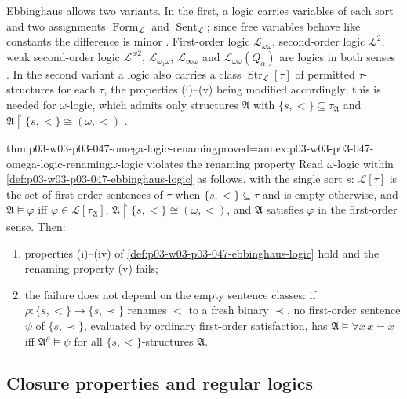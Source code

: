 Ebbinghaus allows two variants.  In the first, a logic carries variables of
each sort and two assignments \(\operatorname{Form}_{\mathscr L}\) and
\(\operatorname{Sent}_{\mathscr L}\); since free variables behave like
constants the difference is minor \cite[Ch.~II, \S1.1.2, pp.~28--29]{Ebbinghaus1985ExtendedLogics}.
First-order logic \(\mathscr L_{\omega\omega}\), second-order logic
\(\mathscr L^2\), weak second-order logic \(\mathscr L^{w2}\),
\(\mathscr L_{\omega_1\omega}\), \(\mathscr L_{\infty\omega}\) and
\(\mathscr L_{\omega\omega}(Q_\alpha)\) are logics in both senses
\cite[Ch.~II, \S1.1.2, p.~29]{Ebbinghaus1985ExtendedLogics}.  In the second
variant a logic also carries a class \(\operatorname{Str}_{\mathscr L}[\tau]\)
of permitted \(\tau\)-structures for each \(\tau\), the properties
(i)--(v) being modified accordingly; this is needed for \(\omega\)-logic,
which admits only structures \(\mathfrak A\) with
\(\{s,<\}\subseteq\tau_{\mathfrak A}\) and
\(\mathfrak A\restriction\{s,<\}\cong(\omega,<)\)
\cite[Ch.~II, \S1.1.3, p.~29]{Ebbinghaus1985ExtendedLogics}.

\begin{hbtheorem}{thm:p03-w03-p03-047-omega-logic-renaming}{proved=annex:p03-w03-p03-047-omega-logic-renaming}{\(\omega\)-logic violates the renaming property}
Read \(\omega\)-logic within \cref{def:p03-w03-p03-047-ebbinghaus-logic} as
follows, with the single sort \(s\): \(\mathscr L[\tau]\) is the set of
first-order sentences of \(\tau\) when \(\{s,<\}\subseteq\tau\) and is empty
otherwise, and \(\mathfrak A\models\varphi\) iff
\(\varphi\in\mathscr L[\tau_{\mathfrak A}]\),
\(\mathfrak A\restriction\{s,<\}\cong(\omega,<)\), and \(\mathfrak A\)
satisfies \(\varphi\) in the first-order sense.  Then:
\begin{enumerate}
 \item properties (i)--(iv) of \cref{def:p03-w03-p03-047-ebbinghaus-logic}
       hold and the renaming property (v) fails;
 \item the failure does not depend on the empty sentence classes: if
       \(\rho:\{s,<\}\to\{s,\prec\}\) renames \(<\) to a fresh binary
       \(\prec\), no first-order sentence \(\psi\) of \(\{s,\prec\}\),
       evaluated by ordinary first-order satisfaction, has
       \(\mathfrak A\models\forall x\,x=x\) iff \(\mathfrak A^\rho\models\psi\)
       for all \(\{s,<\}\)-structures \(\mathfrak A\).
\end{enumerate}
\end{hbtheorem}

\subsection{Closure properties and regular logics}


